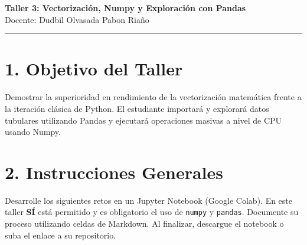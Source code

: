 \documentclass[12pt,a4paper]{article}
\begin{document}
\begin{center}
    {\huge \textcolor{unabblue}{\textbf{Taller 3: Vectorización, Numpy y Exploración con Pandas}}} \\[0.5cm]
    {\large Docente: Dudbil Olvasada Pabon Riaño} \\[0.2cm]
    \rule{\textwidth}{1pt}
\end{center}

\vspace{0.5cm}

\section*{\textcolor{unabblue}{1. Objetivo del Taller}}
Demostrar la superioridad en rendimiento de la vectorización matemática frente a la iteración clásica de Python. El estudiante importará y explorará datos tubulares utilizando Pandas y ejecutará operaciones masivas a nivel de CPU usando Numpy.

\section*{\textcolor{unabblue}{2. Instrucciones Generales}}
Desarrolle los siguientes retos en un Jupyter Notebook (Google Colab). En este taller \textbf{SÍ} está permitido y es obligatorio el uso de \texttt{numpy} y \texttt{pandas}. Documente su proceso utilizando celdas de Markdown. Al finalizar, descargue el notebook o suba el enlace a su repositorio.

\vspace{0.5cm}
\noindent{}
\vspace{0.5cm}
\end{document}
